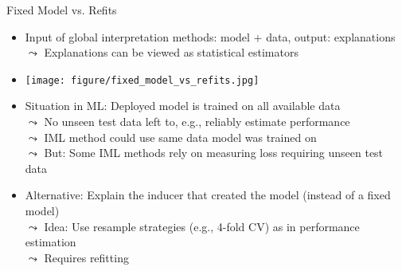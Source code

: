\documentclass[11pt,compress,t,notes=noshow, aspectratio=169, xcolor=table]{beamer}
\newcommand\tab[1][1cm]{\hspace*{#1}}
\begin{document}



\begin{frame}{Fixed Model vs. Refits}
\begin{itemize}
     \item Input of global interpretation methods: model $+$ data, output: explanations\\
    $\leadsto$ Explanations can be viewed as statistical estimators
    \item[] \centerline{\texttt{[image: figure/fixed\_model\_vs\_refits.jpg]}}
    \item Situation in ML: Deployed model is trained on all available data\\
    $\leadsto$ No unseen test data left to, e.g., reliably estimate performance\\
    $\leadsto$ IML method could use same data model was trained on \\
    $\leadsto$ But: Some IML methods rely on measuring loss requiring unseen test data
    \item Alternative: Explain the inducer that created the model (instead of a fixed model)\\
    $\leadsto$ Idea: Use resample strategies (e.g., 4-fold CV) as in performance estimation\\
    $\leadsto$ Requires refitting
\end{itemize}
\end{frame}
\end{document}
